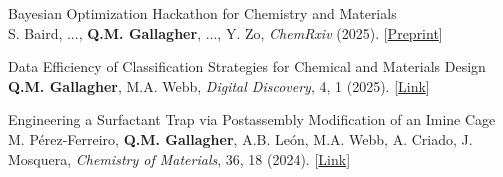\documentclass[letterpaper,11pt]{article}
\begin{document}
\begin{etaremune}
\normalsize \item{ Bayesian Optimization Hackathon for Chemistry and Materials}\\
\vspace{2pt}
\small S. Baird, ..., \textbf{Q.M. Gallagher}, ..., Y. Zo, \textit{ChemRxiv} (2025). [\href{https:www.doi.org/10.26434/chemrxiv-2025-dzh5z}{Preprint}]

\normalsize \item{ Data Efficiency of Classification Strategies for Chemical and Materials Design}\\
\vspace{2pt}
\small \textbf{Q.M. Gallagher}, M.A. Webb, \textit{Digital Discovery}, 4, 1 (2025). [\href{https:www.doi.org/10.1039/d4dd00298a}{Link}]

\normalsize \item{ Engineering a Surfactant Trap via Postassembly Modification of an Imine Cage}\\
\vspace{2pt}
\small M. Pérez-Ferreiro, \textbf{Q.M. Gallagher}, A.B. León, M.A. Webb, A. Criado, J. Mosquera, \textit{Chemistry of Materials}, 36, 18 (2024). [\href{https:www.doi.org/10.1021/acs.chemmater.4c01808}{Link}]

\end{etaremune}
\end{document}
